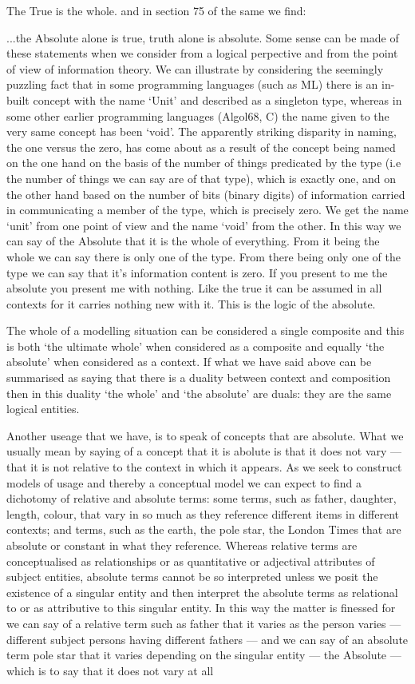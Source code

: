 The True is the whole.
and in section 75 of the same we find:

...the Absolute alone is true, truth alone is absolute.
Some sense can be made of these statements when we consider from a logical perpective and from the point of view of information theory. We can illustrate by considering the seemingly puzzling fact that in some programming languages (such as ML) there is an in-built concept with the name ‘Unit’ and described as a singleton type, whereas in some other earlier programming languages (Algol68, C) the name given to the very same concept has been ‘void’. The apparently striking disparity in naming, the one versus the zero, has come about as a result of the concept being named on the one hand on the basis of the number of things predicated by the type (i.e the number of things we can say are of that type), which is exactly one, and on the other hand based on the number of bits (binary digits) of information carried in communicating a member of the type, which is precisely zero. We get the name ‘unit’ from one point of view and the name ‘void’ from the other. In this way we can say of the Absolute that it is the whole of everything. From it being the whole we can say there is only one of the type. From there being only one of the type we can say that it's information content is zero. If you present to me the absolute you present me with nothing. Like the true it can be assumed in all contexts for it carries nothing new with it. This is the logic of the absolute.

The whole of a modelling situation can be considered a single composite and this is both ‘the ultimate whole’ when considered as a composite and equally ‘the absolute’ when considered as a context. If what we have said above can be summarised as saying that there is a duality between context and composition then in this duality ‘the whole’ and ‘the absolute’ are duals: they are the same logical entities.

Another useage that we have, is to speak of concepts that are absolute. What we usually mean by saying of a concept that it is abolute is that it does not vary — that it is not relative to the context in which it appears. As we seek to construct models of usage and thereby a conceptual model we can expect to find a dichotomy of relative and absolute terms: some terms, such as father, daughter, length, colour, that vary in so much as they reference different items in different contexts; and terms, such as the earth, the pole star, the London Times that are absolute or constant in what they reference. Whereas relative terms are conceptualised as relationships or as quantitative or adjectival attributes of subject entities, absolute terms cannot be so interpreted unless we posit the existence of a singular entity and then interpret the absolute terms as relational to or as attributive to this singular entity. In this way the matter is finessed for we can say of a relative term such as father that it varies as the person varies — different subject persons having different fathers — and we can say of an absolute term pole star that it varies depending on the singular entity — the Absolute — which is to say that it does not vary at all

